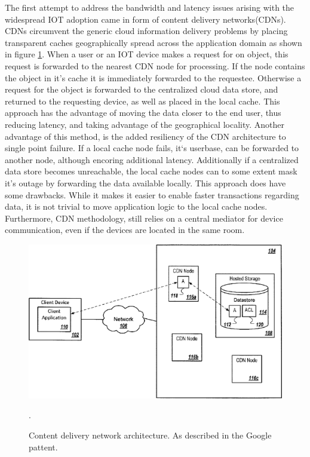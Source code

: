The first attempt to address the bandwidth and latency issues arising with the widespread IOT adoption came in form of content delivery networks(CDNs). CDNs circumvent the generic cloud information delivery problems by placing transparent caches geographically spread across the application domain as shown in figure \ref{lit:fig:2}. When a user or an IOT device makes a request for on object, this request is forwarded to the nearest CDN node for processing. If the node contains the object in it's cache it is immediately forwarded to the requestee. Otherwise a request for the object is forwarded to the centralized cloud data store, and returned to the requesting device, as well as placed in the local cache. This approach has the advantage of moving the data closer to the end user, thus reducing latency, and taking advantage of the geographical locality. Another advantage of this method, is the added resiliency of the CDN architecture to single point failure. If a local cache node fails, it`s userbase, can be forwarded to another node, although encoring additional latency. Additionally if a centralized data store becomes unreachable, the local cache nodes can to some extent mask it's outage by forwarding the data available locally. This approach does have some drawbacks. While it makes it easier to enable faster transactions regarding data, it is not trivial to move application logic to the local cache nodes. Furthermore, CDN methodology, still relies on a central mediator for device communication, even if the devices are located in the same room. 

\begin{figure}[h]
	\centering
	\includegraphics[width=0.6\linewidth]{img/cdn.png}	
	\caption{Content delivery network architecture. As described in the Google pattent.}.
	\label{lit:fig:2}
\end{figure}
